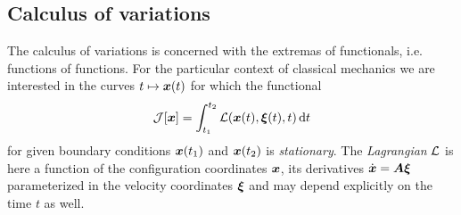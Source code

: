 \subsection{Calculus of variations}\label{sec:CalculusOfVariations}
The calculus of variations is concerned with the extremas of functionals, i.e. functions of functions. %
For the particular context of classical mechanics we are interested in the curves $t \mapsto \boldsymbol{x}(t)$ for which the functional
\begin{align}\label{eq:Functional}
 \mathcal{J}[\boldsymbol{x}] = \int_{t_1}^{t_2} \mathcal{L}(\boldsymbol{x}(t), \boldsymbol{\xi}(t), t) \, \mathrm{d} t
\end{align}
for given boundary conditions $\boldsymbol{x}(t_1)$ and $\boldsymbol{x}(t_2)$ is \textit{stationary}.
The \textit{Lagrangian} $\mathcal{L}$ is here a function of the configuration coordinates $\boldsymbol{x}$, its derivatives $\dot{\boldsymbol{x}} = \boldsymbol{A} \boldsymbol{\xi}$ parameterized in the velocity coordinates $\boldsymbol{\xi}$ and may depend explicitly on the time $t$ as well.

